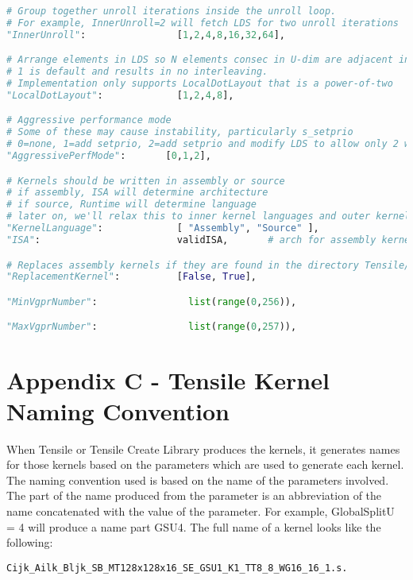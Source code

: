 \documentclass[]{article}
\begin{document}
\begin{lstlisting}[language=python,breaklines=true]
# Group together unroll iterations inside the unroll loop.
# For example, InnerUnroll=2 will fetch LDS for two unroll iterations
"InnerUnroll":                [1,2,4,8,16,32,64],

# Arrange elements in LDS so N elements consec in U-dim are adjacent in LDS
# 1 is default and results in no interleaving.
# Implementation only supports LocalDotLayout that is a power-of-two
"LocalDotLayout":             [1,2,4,8],

# Aggressive performance mode
# Some of these may cause instability, particularly s_setprio
# 0=none, 1=add setprio, 2=add setprio and modify LDS to allow only 2 waves/simd
"AggressivePerfMode":       [0,1,2],

# Kernels should be written in assembly or source
# if assembly, ISA will determine architecture
# if source, Runtime will determine language
# later on, we'll relax this to inner kernel languages and outer kernel languages, such as inline asm embedded in ocl or in llvm
"KernelLanguage":             [ "Assembly", "Source" ],
"ISA":                        validISA,       # arch for assembly kernels

# Replaces assembly kernels if they are found in the directory Tensile/Tensile/ReplacementKernels
"ReplacementKernel":          [False, True],

"MinVgprNumber":                list(range(0,256)),

"MaxVgprNumber":                list(range(0,257)),
\end{lstlisting}

\section{Appendix C - Tensile Kernel Naming Convention}
\label{sec:appendixC}

When Tensile or Tensile Create Library produces the kernels, it generates names for those kernels based on the parameters which are used to generate each kernel. The naming convention used is based on the name of the parameters involved. The part of the name produced from the parameter is an abbreviation of the name concatenated with the value of the parameter. For example, GlobalSplitU = 4 will produce a name part GSU4. The full name of a kernel looks like the following:

\begin{lstlisting}
Cijk_Ailk_Bljk_SB_MT128x128x16_SE_GSU1_K1_TT8_8_WG16_16_1.s.
\end{lstlisting}
\end{document}
